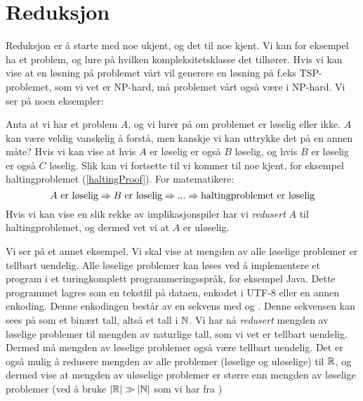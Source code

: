 \section{Reduksjon}
Reduksjon er å starte med noe ukjent, og  det til noe kjent. Vi kan for eksempel ha et problem, og lure på hvilken kompleksitetsklasse det tilhører. Hvis vi kan vise at en løsning på problemet vårt vil generere en løsning på f.eks TSP-problemet, som vi vet er NP-hard, må problemet vårt også være i NP-hard. Vi ser på noen eksempler:

Anta at vi har et problem $ A $, og vi lurer på om problemet er løselig eller ikke. $ A $ kan være veldig vanskelig å forstå, men kanskje vi kan uttrykke det på en annen måte? Hvis vi kan vise at hvis $ A $ er løselig er også $ B $ løselig, og hvis $ B $ er løselig er også $ C $ løselig. Slik kan vi fortsette til vi kommer til noe kjent, for eksempel haltingproblemet (\ref{haltingProof}). For matematikere:
\[ \text{$ A $ er løselig} \Rightarrow \text{$ B $ er løselig} \Rightarrow ... \Rightarrow \text{haltingproblemet er løselig} \]
Hvis vi kan vise en slik rekke av implikasjonspiler har vi \emph{redusert} $ A $ til haltingproblemet, og dermed vet vi at $ A $ er uløselig.

Vi ser på et annet eksempel. Vi skal vise at mengden av alle løselige problemer er tellbart uendelig. Alle løselige problemer kan løses ved å implementere et program i et turingkomplett programmeringsspråk, for eksempel Java. Dette programmet lagres som en tekstfil på dataen, enkodet i UTF-8 eller en annen enkoding. Denne enkodingen består av en sekvens med  og . Denne sekvensen kan sees på som et binært tall, altså et tall i $ \mathbb{N} $. Vi har nå \textit{redusert} mengden av løselige problemer til mengden av naturlige tall, som vi vet er tellbart uendelig. Dermed må mengden av løselige problemer også være tellbart uendelig. Det er også mulig å redusere mengden av alle problemer (løselige og uløselige) til $ \mathbb{R} $, og dermed vise at mengden av uløselige problemer er større enn mengden av løselige problemer (ved å bruke $ \left|\mathbb{R}\right| \gg \left|\mathbb{N}\right| $ som vi har fra )
